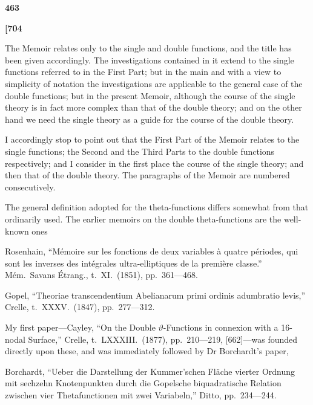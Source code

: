 \documentclass[11pt,a4paper]{book}
\begin{document}
\begin{center}
\textbf{463}
\end{center}

\vspace{0.5em}

\noindent\textbf{[704}

\vspace{0.5em}

The Memoir relates only to the single and double functions, and the title has been given accordingly. The investigations contained in it extend to the single functions referred to in the First Part; but in the main and with a view to simplicity of notation the investigations are applicable to the general case of the double functions; but in the present Memoir, although the course of the single theory is in fact more complex than that of the double theory; and on the other hand we need the single theory as a guide for the course of the double theory.

I accordingly stop to point out that the First Part of the Memoir relates to the single functions; the Second and the Third Parts to the double functions respectively; and I consider in the first place the course of the single theory; and then that of the double theory. The paragraphs of the Memoir are numbered consecutively.

The general definition adopted for the theta-functions differs somewhat from that ordinarily used. The earlier memoirs on the double theta-functions are the well-known ones

\noindent Rosenhain, ``M\'{e}moire sur les fonctions de deux variables \`{a} quatre p\'{e}riodes, qui sont les inverses des int\'{e}grales ultra-elliptiques de la premi\`{e}re classe.'' M\'{e}m.\ Savans \'{E}trang., t.~XI.\ (1851), pp.~361---468.

\noindent Gopel, ``Theoriae transcendentium Abelianarum primi ordinis adumbratio levis,'' Crelle, t.~XXXV.\ (1847), pp.~277---312.

\noindent My first paper---Cayley, ``On the Double $\vartheta$-Functions in connexion with a 16-nodal Surface,'' Crelle, t.~LXXXIII.\ (1877), pp.~210---219, [662]---was founded directly upon these, and was immediately followed by Dr Borchardt's paper,

\noindent Borchardt, ``Ueber die Darstellung der Kummer'schen Fl\"{a}che vierter Ordnung mit sechzehn Knotenpunkten durch die Gopelsche biquadratische Relation zwischen vier Thetafunctionen mit zwei Variabeln,'' Ditto, pp.~234---244.
\end{document}
